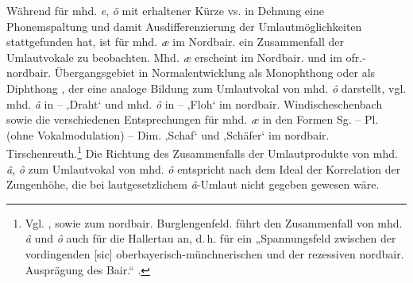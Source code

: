 Während für mhd. \textit{e}, \textit{ö} mit erhaltener Kürze vs. in Dehnung eine Phonemspaltung und damit Ausdifferenzierung der Umlautmöglichkeiten stattgefunden hat, ist für mhd. \textit{æ} im Nordbair. ein Zusammenfall der Umlautvokale zu beobachten. Mhd. \textit{æ} erscheint im Nordbair. und im ofr.-nordbair. Übergangsgebiet in Normalentwicklung als Monophthong  oder als Diphthong , der eine analoge Bildung zum Umlautvokal von mhd. \textit{ô} darstellt, vgl. mhd. \textit{â} in  --  ‚Draht‘ und mhd. \textit{ô} in  --  ‚Floh‘ im nordbair. Windischeschenbach sowie die verschiedenen Entsprechungen für mhd. \textit{æ} in den Formen Sg.   -- Pl.  (ohne Vokalmodulation) -- Dim.  ‚Schaf‘ und  ‚Schäfer‘ im nordbair. Tirschenreuth.\footnote{Vgl. \citet[Karte 10]{Gütter1971}, \citet[§2h]{Kranzmayer1956} sowie \citet[Karte 41]{Steinhauser1965} zum nordbair. Burglengenfeld. \citet[66]{Zehetner1978} führt den Zusammenfall von mhd. \textit{â} und \textit{ô} auch für die Hallertau an, d.\,h. für ein „Spannungsfeld zwischen der vordingenden [sic] oberbayerisch-münchnerischen und der rezessiven nordbair. Ausprägung des Bair.“ \citep[56]{Zehetner1978}.} Die Richtung des Zusammenfalls der Umlautprodukte von mhd. \textit{â}, \textit{ô} zum Umlautvokal von mhd. \textit{ô} entspricht nach \citet[121]{Rowley1997} dem Ideal der Korrelation der Zungenhöhe, die bei lautgesetzlichem \textit{â}{}-Umlaut nicht gegeben gewesen wäre.


